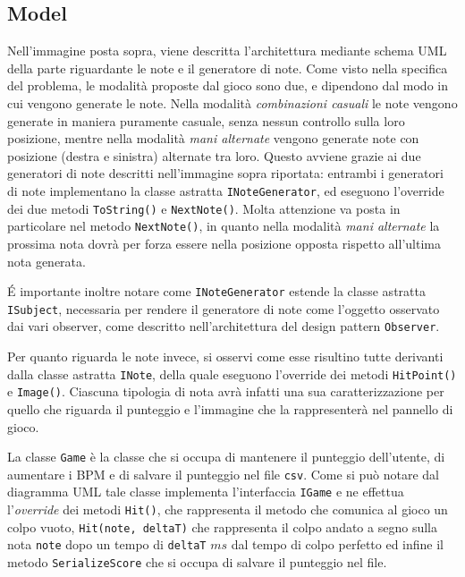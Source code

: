 \newpage
\subsection{Model}
\begin{figure}[h]
\end{figure}
\vspace{1cm}

Nell'immagine posta sopra, viene descritta l'architettura mediante schema UML della parte riguardante le note e il generatore di note. Come visto nella specifica del problema, le modalità proposte dal gioco sono due, e dipendono dal modo in cui vengono generate le note. Nella modalità \emph{combinazioni casuali} le note vengono generate in maniera puramente casuale, senza nessun controllo sulla loro posizione, mentre nella modalità \emph{mani alternate} vengono generate note con posizione (destra e sinistra) alternate tra loro. Questo avviene grazie ai due generatori di note descritti nell'immagine sopra riportata: entrambi i generatori di note implementano la classe astratta \texttt{INoteGenerator}, ed eseguono l'override dei due metodi \texttt{ToString()} e \texttt{NextNote()}. Molta attenzione va posta in particolare nel metodo \texttt{NextNote()}, in quanto nella modalità \emph{mani alternate} la prossima nota dovrà per forza essere nella posizione opposta rispetto all'ultima nota generata.

É importante inoltre notare come \texttt{INoteGenerator} estende la classe astratta \texttt{ISubject}, necessaria per rendere il generatore di note come l'oggetto osservato dai vari observer, come descritto nell'architettura del design pattern \texttt{Observer}.

Per quanto riguarda le note invece, si osservi come esse risultino tutte derivanti dalla classe astratta \texttt{INote}, della quale eseguono l'override dei metodi \texttt{HitPoint()} e \texttt{Image()}. Ciascuna tipologia di nota avrà infatti una sua caratterizzazione per quello che riguarda il punteggio e l'immagine che la rappresenterà nel pannello di gioco.

\vspace{1cm}
\begin{figure}[h]
\end{figure}
La classe \texttt{Game} è la classe che si occupa di mantenere il punteggio dell'utente, di aumentare i BPM e di salvare il punteggio nel file \texttt{csv}.
Come si può notare dal diagramma UML tale classe implementa l'interfaccia \texttt{IGame} e ne effettua l'\emph{override} dei metodi \texttt{Hit()}, che rappresenta il metodo che comunica al gioco un colpo vuoto, \texttt{Hit(note, deltaT)} che rappresenta il colpo andato a segno sulla nota \texttt{note} dopo un tempo di \texttt{deltaT} $ms$ dal tempo di colpo perfetto ed infine il metodo \texttt{SerializeScore} che si occupa di salvare il punteggio nel file.

